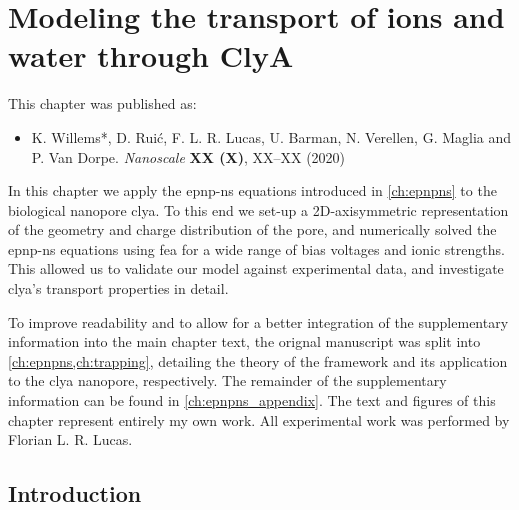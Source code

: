 \chapter{Modeling the transport of ions and water through {ClyA}}
%
\label{ch:transport}
%


%
%
\begin{shaded}
This chapter was published as:
%
\begin{itemize}
  \item K. Willems*, D. Rui\'{c}, F. L. R. Lucas, U. Barman, N. Verellen, G. Maglia and P. Van Dorpe.
        \textit{Nanoscale} \textbf{XX (X)}, XX--XX (2020) %
\end{itemize}
%
\newpage
\end{shaded}
%
%

\glsresetall
%

In this chapter we apply the \gls{epnp-ns} equations introduced in \cref{ch:epnpns} to the biological nanopore
\gls{clya}. To this end we set-up a 2D-axisymmetric representation of the geometry and charge distribution of
the pore, and numerically solved the \gls{epnp-ns} equations using \gls{fea} for a wide range of bias voltages
and ionic strengths. This allowed us to validate our model against experimental data, and investigate
\gls{clya}'s transport properties in detail.
%

%
To improve readability and to allow for a better integration of the supplementary information into the main
chapter text, the orignal manuscript was split into \cref{ch:epnpns,ch:trapping}, detailing the theory of the
framework and its application to the \gls{clya} nanopore, respectively. The remainder of the supplementary
information can be found in \cref{ch:epnpns_appendix}. The text and figures of this chapter represent entirely
my own work. All experimental work was performed by Florian L. R. Lucas.
%

%
%
%
%


\section{Introduction}
%
\label{sec:transport:intro}
%

